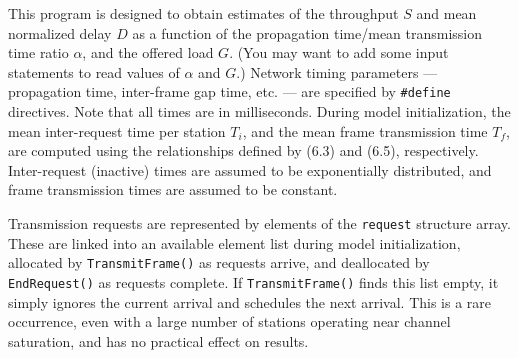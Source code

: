 This program is designed to obtain estimates of the throughput $S$ and mean normalized delay $D$ as a function of the propagation time/mean transmission time ratio $\alpha$, and the offered load $G$. (You may want to add some input statements to read values of $\alpha$ and $G$.) Network timing parameters --- propagation time, inter-frame gap time, etc. --- are specified by \texttt{\#define} directives. Note that all times are in milliseconds. During model initialization, the mean inter-request time per station $T_i$, and the mean frame transmission time $T_f$, are computed using the relationships defined by (6.3) and (6.5), respectively. Inter-request (inactive) times are assumed to be exponentially distributed, and frame transmission times are assumed to be constant.

Transmission requests are represented by elements of the \texttt{request} structure array. These are linked into an available element list during model initialization, allocated by \texttt{TransmitFrame()} as requests arrive, and deallocated by \texttt{EndRequest()} as requests complete. If \texttt{TransmitFrame()} finds this list empty, it simply ignores the current arrival and schedules the next arrival. This is a rare occurrence, even with a large number of stations operating near channel saturation, and has no practical effect on results.

